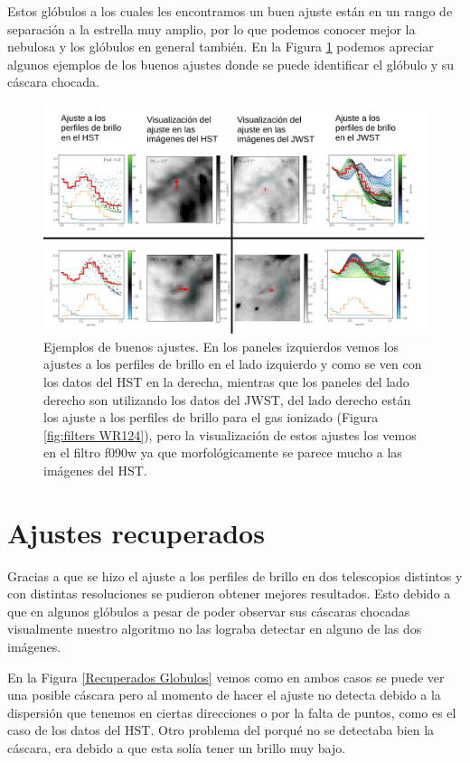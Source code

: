 \documentclass{book}
\begin{document}
Estos glóbulos a los cuales les encontramos un buen ajuste están en un rango de separación a la estrella muy amplio, por lo que podemos conocer mejor la nebulosa y los glóbulos en general también. En la Figura \ref{Goog G} podemos apreciar algunos ejemplos de los buenos ajustes donde se puede identificar el glóbulo y su cáscara chocada.

\begin{figure}[htb]
    \centering
    \includegraphics[width=\textwidth]{imagenes_corregidas/buenos_aj.pdf}
    \caption{Ejemplos de buenos ajustes. En los paneles izquierdos vemos los ajustes a los perfiles de brillo en el lado izquierdo y como se ven con los datos del HST en la derecha, mientras que los paneles del lado derecho son utilizando los datos del JWST, del lado derecho están  los ajuste a los perfiles de brillo para el gas ionizado (Figura \ref{fig:filters WR124}), pero la visualización de estos ajustes los vemos en el filtro f090w ya que morfológicamente se parece mucho a las imágenes del HST.}
    \label{Goog G}
\end{figure}

\section{Ajustes recuperados}

Gracias a que se hizo el ajuste a los perfiles de brillo en dos telescopios distintos y con distintas resoluciones se pudieron obtener mejores resultados. Esto debido a que en algunos glóbulos a pesar de poder observar sus cáscaras chocadas visualmente nuestro algoritmo no las lograba detectar en alguno de las dos imágenes. 

En la Figura \ref{Recuperados Globulos} vemos como en  ambos casos se puede ver una posible cáscara pero al momento de hacer el ajuste no detecta debido a la dispersión que tenemos en ciertas direcciones o por la falta de puntos, como es el caso de los datos del HST. Otro problema del porqué no se detectaba bien la cáscara, era debido a que esta solía tener un brillo muy bajo.
\end{document}
